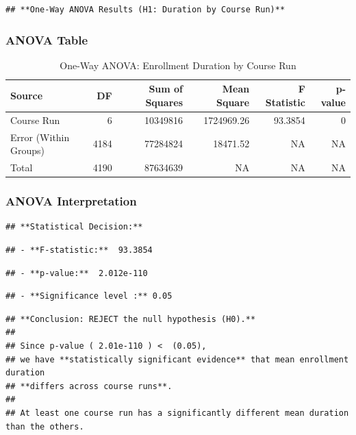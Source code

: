 \documentclass[
]{article}
\begin{document}
\begin{verbatim}
## **One-Way ANOVA Results (H1: Duration by Course Run)**
\end{verbatim}

\subsubsection{ANOVA Table}\label{anova-table}

\begin{longtable}[t]{lrrrrr}
\caption{\label{tab:h1-anova-table}One-Way ANOVA: Enrollment Duration by Course Run}\\
\toprule
Source & DF & Sum of Squares & Mean Square & F Statistic & p-value\\
\midrule
Course Run & 6 & 10349816 & 1724969.26 & 93.3854 & 0\\
Error (Within Groups) & 4184 & 77284824 & 18471.52 & NA & NA\\
Total & 4190 & 87634639 & NA & NA & NA\\
\bottomrule
\end{longtable}

\subsubsection{ANOVA Interpretation}\label{anova-interpretation}

\begin{verbatim}
## **Statistical Decision:**
\end{verbatim}

\begin{verbatim}
## - **F-statistic:**  93.3854
\end{verbatim}

\begin{verbatim}
## - **p-value:**  2.012e-110
\end{verbatim}

\begin{verbatim}
## - **Significance level :** 0.05
\end{verbatim}

\begin{verbatim}
## **Conclusion: REJECT the null hypothesis (H0).**
## 
## Since p-value ( 2.01e-110 ) <  (0.05),
## we have **statistically significant evidence** that mean enrollment duration
## **differs across course runs**.
## 
## At least one course run has a significantly different mean duration than the others.
\end{verbatim}
\end{document}
